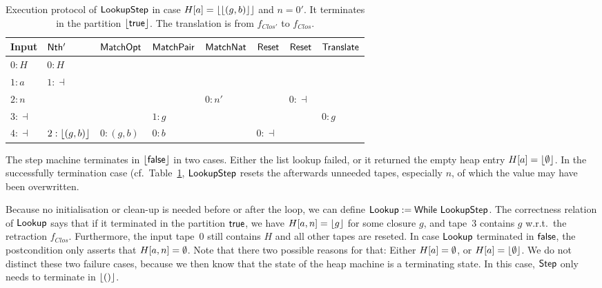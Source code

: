 \begin{table}[t]
  \centering
  \scriptsize
  \begin{tabular}{l||l|l|l|l|l|l|l}
    Input      & $\mathsf{Nth'}$      & $\mathsf{MatchOpt}$       & $\mathsf{MatchPair}$     & $\mathsf{MatchNat}$ & $\mathsf{Reset}$ & $\mathsf{Reset}$ & $\mathsf{Translate}$ \\ \hline
    $0:H$      & $0:H$            &                       &                      &                 &              &              &                  \\
    $1:a$      & $1:\dashv$       &                       &                      &                 &              &              &                  \\
    $2:n$      &                  &                       &                      & $0:n'$          &              & $0:\dashv$   &                  \\
    $3:\dashv$ &                  &                       & $1: g$               &                 &              &              & $0:g$            \\
    $4:\dashv$ & $2:\left\lfloor {(g,b)} \right\rfloor$ & $0:(g,b)$             & $0:b$                &                 & $0:\dashv$   &              &                  \\
  \end{tabular}
  \caption{Execution protocol of $\mathsf{LookupStep}$ in case $H[a] = \left\lfloor {\left\lfloor {(g,b)} \right\rfloor} \right\rfloor$ and $n=0'$.  It terminates in the partition $\left\lfloor {\ensuremath{\mathsf{true}}} \right\rfloor$.  The
    translation is from $f_{Clos'}$ to $f_{Clos}$.}
  \label{tab:exec-LookupStep-0}
\end{table}

The step machine terminates in $\left\lfloor {\ensuremath{\mathsf{false}}} \right\rfloor$ in two cases.  Either the list lookup failed, or it returned the empty heap entry $H[a]=\left\lfloor {\emptyset} \right\rfloor$.  In
the successfully termination case (cf.\ Table~\ref{tab:exec-LookupStep-0}, $\mathsf{LookupStep}$ resets the afterwards unneeded tapes, especially $n$, of
which the value may have been overwritten.

Because no initialisation or clean-up is needed before or after the loop, we can define $\mathsf{Lookup} := \mathsf{While}~\mathsf{LookupStep}$.  The correctness
relation of $\mathsf{Lookup}$ says that if it terminated in the partition $\mathsf{true}$, we have $H[a,n] = \left\lfloor {g} \right\rfloor$ for some closure $g$, and tape~$3$ contains
$g$ w.r.t.\ the retraction $f_{Clos}$.  Furthermore, the input tape~$0$ still contains $H$ and all other tapes are reseted.  In case $\mathsf{Lookup}$
terminated in $\mathsf{false}$, the postcondition only asserts that $H[a,n]=\emptyset$.  Note that there two possible reasons for that: Either $H[a]=\emptyset$, or
$H[a]=\left\lfloor {\emptyset} \right\rfloor$.  We do not distinct these two failure cases, because we then know that the state of the heap machine is a terminating state.  In
this case, $\mathsf{Step}$ only needs to terminate in $\left\lfloor {\ensuremath{\mathsf{()}}} \right\rfloor$.

